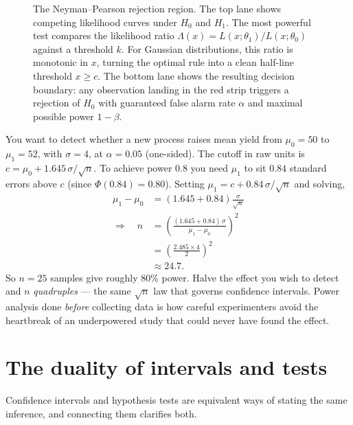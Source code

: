 \begin{figure}[H]
\caption{The Neyman--Pearson rejection region. The top lane shows competing likelihood curves under $H_0$ and $H_1$. The most powerful test compares the likelihood ratio $\Lambda(x) = L(x;\theta_1)/L(x;\theta_0)$ against a threshold $k$. For Gaussian distributions, this ratio is monotonic in $x$, turning the optimal rule into a clean half-line threshold $x \ge c$. The bottom lane shows the resulting decision boundary: any observation landing in the red strip triggers a rejection of $H_0$ with guaranteed false alarm rate $\alpha$ and maximal possible power $1-\beta$.}
\label{ch32:fig-neyman-pearson}
\end{figure}

\begin{example}
\label{ch32:ex-power}
You want to detect whether a new process raises mean yield from $\mu_0=50$ to
$\mu_1=52$, with $\sigma=4$, at $\alpha=0.05$ (one-sided). The cutoff in raw units is
$c = \mu_0 + 1.645\,\sigma/\sqrt n$. To achieve power $0.8$ you need $\mu_1$ to sit
$0.84$ standard errors above $c$ (since $\Phi(0.84)=0.80$). Setting
$\mu_1 = c + 0.84\,\sigma/\sqrt n$ and solving,
\begin{align*}
  \mu_1 - \mu_0 &= (1.645 + 0.84)\frac{\sigma}{\sqrt n} \\
  \Rightarrow\quad n &= \left(\frac{(1.645+0.84)\,\sigma}{\mu_1-\mu_0}\right)^2 \\
  &= \left(\frac{2.485 \times 4}{2}\right)^2 \\
  &\approx 24.7.
\end{align*}
So $n=25$ samples give roughly $80\%$ power. Halve the effect you wish to detect and $n$
\emph{quadruples} --- the same $\sqrt n$ law that governs confidence intervals. Power
analysis done \emph{before} collecting data is how careful experimenters avoid the
heartbreak of an underpowered study that could never have found the effect.
\end{example}

\section{The duality of intervals and tests}
\label{ch32:duality}

Confidence intervals and hypothesis tests are equivalent ways of stating the same inference,
and connecting them clarifies both.

